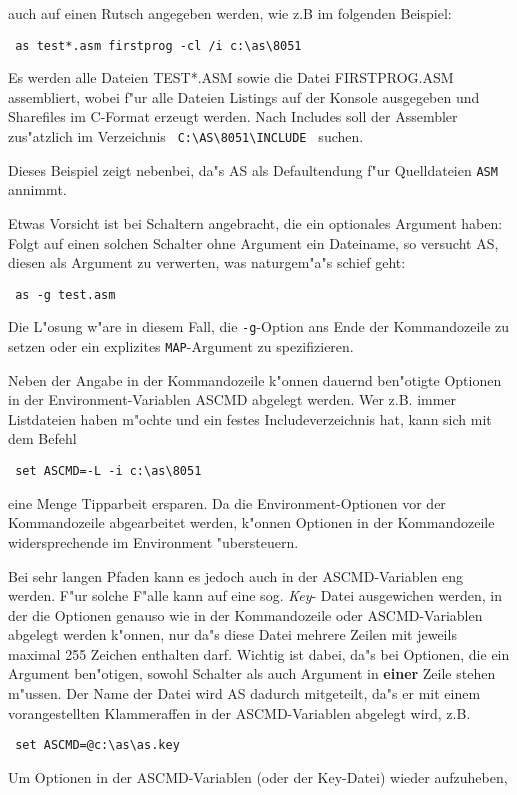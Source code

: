 \documentclass[12pt,a4paper,twoside]{report}
\newcommand{\ii}[1]{{\it #1}}
\newcommand{\bb}[1]{{\bf #1}}
\newcommand{\tty}[1]{{\tt #1}}
\begin{document}
auch auf einen Rutsch angegeben werden, wie z.B im folgenden Beispiel:
\begin{verbatim}
 as test*.asm firstprog -cl /i c:\as\8051
\end{verbatim}
Es werden alle Dateien TEST*.ASM sowie die Datei FIRSTPROG.ASM
assembliert, wobei f"ur alle Dateien Listings auf der Konsole
ausgegeben und Sharefiles im C-Format erzeugt werden.  Nach Includes
soll der Assembler zus"atzlich im Verzeichnis \verb! C:\AS\8051\INCLUDE !
suchen.
\par
Dieses Beispiel zeigt nebenbei, da"s AS als Defaultendung f"ur Quelldateien
\tty{ASM} annimmt.
\par
Etwas Vorsicht ist bei Schaltern angebracht, die ein optionales Argument
haben: Folgt auf einen solchen Schalter ohne Argument ein Dateiname, so
versucht AS, diesen als Argument zu verwerten, was naturgem"a"s schief
geht:
\begin{verbatim}
 as -g test.asm
\end{verbatim}
Die L"osung w"are in diesem Fall, die \tty{-g}-Option ans Ende der
Kommandozeile zu setzen oder ein explizites \tty{MAP}-Argument zu
spezifizieren.
\par
Neben der Angabe in der Kommandozeile k"onnen dauernd ben"otigte
Optionen in der Environment-Variablen ASCMD abgelegt werden. Wer z.B.
immer Listdateien haben m"ochte und ein festes Includeverzeichnis hat,
kann sich mit dem Befehl
\begin{verbatim}
 set ASCMD=-L -i c:\as\8051
\end{verbatim}
eine Menge Tipparbeit ersparen.  Da die Environment-Optionen vor der
Kommandozeile abgearbeitet werden, k"onnen Optionen in der
Kommandozeile widersprechende im Environment "ubersteuern.
\par
Bei sehr langen Pfaden kann es jedoch auch in der ASCMD-Variablen eng
werden.  F"ur solche F"alle kann auf eine sog. \ii{Key}- Datei
ausgewichen werden, in der die Optionen genauso wie in der Kommandozeile
oder ASCMD-Variablen abgelegt werden k"onnen, nur da"s diese Datei
mehrere Zeilen mit jeweils maximal 255 Zeichen enthalten darf.  Wichtig
ist dabei, da"s bei Optionen, die ein Argument ben"otigen, sowohl Schalter
als auch Argument in \bb{einer} Zeile stehen m"ussen.  Der Name der
Datei wird AS dadurch mitgeteilt, da"s er mit einem vorangestellten
Klammeraffen in der ASCMD-Variablen abgelegt wird, z.B.
\begin{verbatim}
 set ASCMD=@c:\as\as.key
\end{verbatim}
Um Optionen in der ASCMD-Variablen (oder der Key-Datei) wieder aufzuheben,
\end{document}
